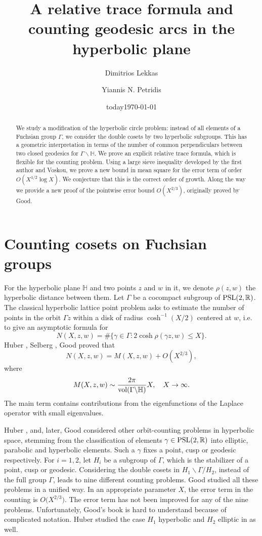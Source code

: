 \documentclass[a4paper,11pt]{amsart}
\title[Counting geodesic arcs]{A relative trace formula and counting geodesic arcs in the hyperbolic plane}
\date{today}
\author[D. Lekkas]{Dimitrios Lekkas}
\author[Y. Petridis]{Yiannis N. Petridis}
\date{\today}
\theoremstyle{definition}
\begin{document}
\begin{abstract}
We study a modification of the hyperbolic circle problem: instead of all elements of a Fuchsian group $\Gamma$,  we consider the double cosets by two hyperbolic subgroups. This has a geometric interpretation in terms of the number of common perpendiculars between two closed geodesics for $\Gamma \backslash\mathbb{H}$. We prove an explicit relative trace formula, which is flexible for the counting problem. Using a large sieve inequality developed by the first author and Voskou, we prove a new bound in mean square for the error term of order $O(X^{1/2}\log X)$. We conjecture that this is the correct order of growth. Along the way we provide a new proof of the pointwise error bound $O(X^{2/3})$, originally proved by Good.
\end{abstract}

\maketitle
\section{Counting cosets on Fuchsian groups}\label{Counting cosets on Fuchsian groups}



For the hyperbolic plane $ \mathbb H$ and two points $z$ and $w$ in it, we denote  $\rho (z, w)$
the hyperbolic distance between them.  Let $
\Gamma$ be a cocompact 
subgroup of $\hbox{PSL}(2, \mathbb R)$. The classical hyperbolic lattice point problem asks to estimate the number
of points in the orbit $\Gamma z$ within a disk of radius $\cosh^{-1}(X/2)$  centered  at $w$, i.e. to give
an asymptotic formula for $$N(X, z, w )=\#\{\gamma \in \Gamma : 2\cosh \rho (\gamma z, w) \le X\}.$$
Huber \cite{Hu59},  Selberg \cite{Selberg}, Good \cite{Good} proved that
$$N(X, z, w)=M (X, z, w)+O(X^{2/3}),$$ where
$$M(X, z, w)\sim \frac{2\pi}{\hbox{vol}(\Gamma\backslash \mathbb H)} X, \quad X\to \infty.$$
The main term contains contributions from the eigenfunctions of the Laplace operator with small eigenvalues. 

Huber \cite{HuHel}, and, later, Good \cite{Good} considered other orbit-counting problems in hyperbolic space, stemming from the classification of 
 elements $\gamma \in \hbox{PSL}(2,\mathbb{R})$
into elliptic, parabolic and hyperbolic elements. Such a $\gamma$ fixes a point, cusp or geodesic respectively.  For $i=1,2$, let $H_i$ be a subgroup of $\Gamma$, which is the stabilizer of a point, cusp or geodesic. Considering the double cosets in $H_1 \backslash \Gamma /H_2$, instead of the full group $\Gamma$, leads to nine different counting problems. Good \cite{Good} studied all these  problems in a unified way. In an appropriate parameter $X$, the error term in the counting is $O\big(X^{2/3}\big)$. The error term has not been improved for any of the nine problems. Unfortunately, Good's book is hard to understand because of complicated notation. 
 Huber studied  the case $H_1$ hyperbolic and $H_2$ elliptic  in \cite{Hu98} as well.
 
\end{document}
